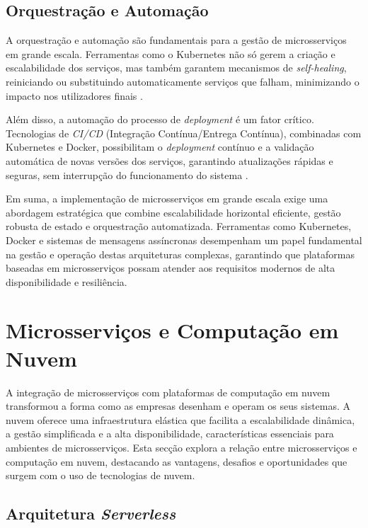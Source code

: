 \subsection{Orquestração e Automação}

A orquestração e automação são fundamentais para a gestão de microsserviços em grande escala. Ferramentas como o Kubernetes não só gerem a criação e escalabilidade dos serviços, mas também garantem mecanismos de \textit{self-healing}, reiniciando ou substituindo automaticamente serviços que falham, minimizando o impacto nos utilizadores finais \cite{Burns2016}. 

Além disso, a automação do processo de \textit{deployment} é um fator crítico. Tecnologias de \textit{CI/CD} (Integração Contínua/Entrega Contínua), combinadas com Kubernetes e Docker, possibilitam o \textit{deployment} contínuo e a validação automática de novas versões dos serviços, garantindo atualizações rápidas e seguras, sem interrupção do funcionamento do sistema \cite{Taherizadeh2020}.

Em suma, a implementação de microsserviços em grande escala exige uma abordagem estratégica que combine escalabilidade horizontal eficiente, gestão robusta de estado e orquestração automatizada. Ferramentas como Kubernetes, Docker e sistemas de mensagens assíncronas desempenham um papel fundamental na gestão e operação destas arquiteturas complexas, garantindo que plataformas baseadas em microsserviços possam atender aos requisitos modernos de alta disponibilidade e resiliência.

\clearpage

\section{Microsserviços e Computação em Nuvem}

A integração de microsserviços com plataformas de computação em nuvem transformou a forma como as empresas desenham e operam os seus sistemas. A nuvem oferece uma infraestrutura elástica que facilita a escalabilidade dinâmica, a gestão simplificada e a alta disponibilidade, características essenciais para ambientes de microsserviços. Esta secção explora a relação entre microsserviços e computação em nuvem, destacando as vantagens, desafios e oportunidades que surgem com o uso de tecnologias de nuvem.

\subsection{Arquitetura \textit{Serverless}}

